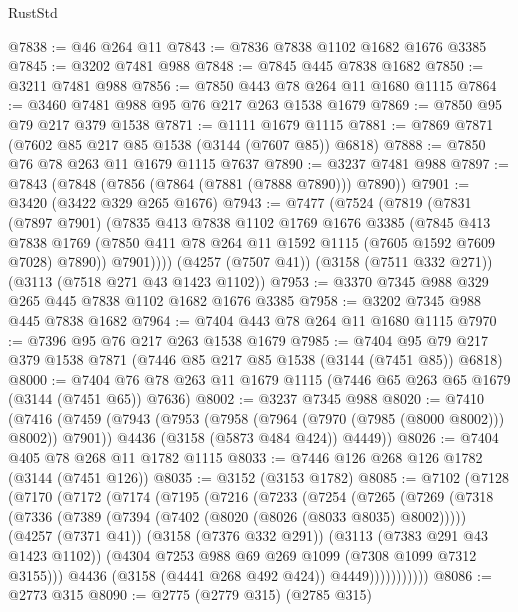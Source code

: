 \begin{lexlean}{RustStd}
\begin{coremodule}
@7838 := @46 @264 @11
@7843 := @7836 @7838 @1102 @1682 @1676 @3385
@7845 := @3202 @7481 @988
@7848 := @7845 @445 @7838 @1682
@7850 := @3211 @7481 @988
@7856 := @7850 @443 @78 @264 @11 @1680 @1115
@7864 := @3460 @7481 @988 @95 @76 @217 @263 @1538 @1679
@7869 := @7850 @95 @79 @217 @379 @1538
@7871 := @1111 @1679 @1115
@7881 := @7869 @7871 (@7602 @85 @217 @85 @1538 (@3144 (@7607 @85)) @6818)
@7888 := @7850 @76 @78 @263 @11 @1679 @1115 @7637
@7890 := @3237 @7481 @988
@7897 := @7843 (@7848 (@7856 (@7864 (@7881 (@7888 @7890))) @7890))
@7901 := @3420 (@3422 @329 @265 @1676)
@7943 := @7477
    (@7524
      (@7819
        (@7831
          (@7897 @7901)
          (@7835
            @413
            @7838
            @1102
            @1769
            @1676
            @3385
            (@7845
              @413
              @7838
              @1769
              (@7850 @411 @78 @264 @11 @1592 @1115 (@7605 @1592 @7609 @7028) @7890))
            @7901))))
    (@4257 (@7507 @41))
    (@3158 (@7511 @332 @271))
    (@3113 (@7518 @271 @43 @1423 @1102))
@7953 := @3370 @7345 @988 @329 @265 @445 @7838 @1102 @1682 @1676 @3385
@7958 := @3202 @7345 @988 @445 @7838 @1682
@7964 := @7404 @443 @78 @264 @11 @1680 @1115
@7970 := @7396 @95 @76 @217 @263 @1538 @1679
@7985 := @7404 @95 @79 @217 @379 @1538 @7871 (@7446 @85 @217 @85 @1538 (@3144 (@7451 @85)) @6818)
@8000 := @7404 @76 @78 @263 @11 @1679 @1115 (@7446 @65 @263 @65 @1679 (@3144 (@7451 @65)) @7636)
@8002 := @3237 @7345 @988
@8020 := @7410
    (@7416
      (@7459
        (@7943 (@7953 (@7958 (@7964 (@7970 (@7985 (@8000 @8002))) @8002)) @7901))
        @4436
        (@3158 (@5873 @484 @424))
        @4449))
@8026 := @7404 @405 @78 @268 @11 @1782 @1115
@8033 := @7446 @126 @268 @126 @1782 (@3144 (@7451 @126))
@8035 := @3152 (@3153 @1782)
@8085 := @7102
    (@7128
      (@7170
        (@7172
          (@7174
            (@7195
              (@7216
                (@7233
                  (@7254
                    (@7265
                      (@7269
                        (@7318
                          (@7336
                            (@7389 (@7394 (@7402 (@8020 (@8026 (@8033 @8035) @8002)))))
                            (@4257 (@7371 @41))
                            (@3158 (@7376 @332 @291))
                            (@3113 (@7383 @291 @43 @1423 @1102))
                            (@4304 @7253 @988 @69 @269 @1099 (@7308 @1099 @7312 @3155)))
                          @4436
                          (@3158 (@4441 @268 @492 @424))
                          @4449)))))))))))
@8086 := @2773 @315
@8090 := @2775 (@2779 @315) (@2785 @315)

\end{coremodule}
\end{lexlean}
